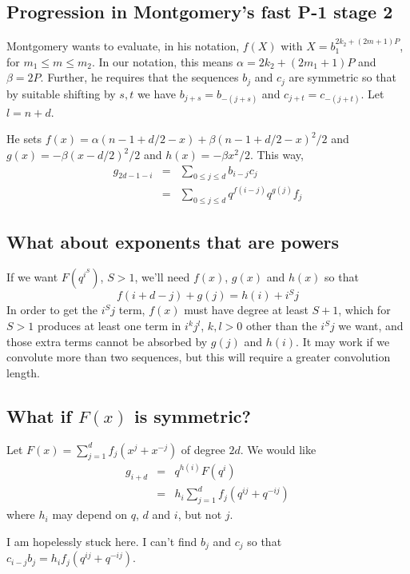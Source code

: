 \documentclass{article}
\begin{document}
\subsection{Progression in Montgomery's fast P-1 stage 2}
Montgomery wants to evaluate, in his notation, $f(X)$ with 
$X=b_1^{2k_2 + (2m+1)P}$, for $m_1 \leq m \leq m_2$. In our notation, 
this means $\alpha = 2k_2 + (2m_1+1)P$ and $\beta = 2P$. Further, he requires 
that the sequences $b_j$ and $c_j$ are symmetric so that by suitable shifting 
by $s, t$ we have $b_{j+s} = b_{-(j+s)}$ and $c_{j+t} = c_{-(j+t)}$. 
Let $l = n + d$.

He sets $f(x)=\alpha (n-1+d/2-x)+\beta(n-1+d/2-x)^2/2$ and 
$g(x)=-\beta(x-d/2)^2/2$ and $h(x) = -\beta x^2/2$.
This way, 
\begin{eqnarray*}
g_{2d-1-i} & = & \sum_{0\leq j\leq d} b_{i-j} c_j \\
           & = & \sum_{0\leq j\leq d} q^{f(i-j)} q^{g(j)} f_j
\end{eqnarray*}


\subsection{What about exponents that are powers}
If we want $F(q^{i^S})$, $S>1$, we'll need $f(x)$, $g(x)$ and $h(x)$ so that
\begin{displaymath}
  f(i+d-j) + g(j) = h(i) + i^{S}j
\end{displaymath}
In order to get the $i^{S}j$ term, $f(x)$ must have degree at least $S+1$, 
which for $S>1$ produces at least one term in $i^k j^l$, $k,l>0$ other
than the $i^{S}j$ we want, and those extra terms cannot be absorbed by $g(j)$ 
and $h(i)$. It may work if we convolute more than two sequences, 
but this will require a greater convolution length.

\subsection{What if $F(x)$ is symmetric?}
Let $F(x) = \sum_{j=1}^{d} f_j (x^j + x^{-j})$ of degree $2d$.
We would like
\begin{eqnarray*}
g_{i+d} & = & q^{h(i)} F(q^i) \\
 & = & h_i \sum_{j=1}^{d} f_j \left(q^{ij} + q^{-ij} \right) 
\end{eqnarray*}
where $h_i$ may depend on $q$, $d$ and $i$, but not $j$.

I am hopelessly stuck here. I can't find $b_j$ and $c_j$ so that 
$c_{i-j}b_j = h_i f_j \left(q^{ij} + q^{-ij} \right)$.
\end{document}
